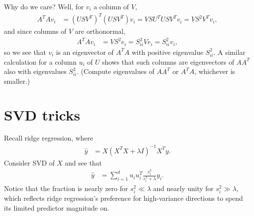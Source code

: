\documentclass[11pt,letterpaper]{article}
\theoremstyle{definition}
\theoremstyle{plain}
\numberwithin{equation}{section}
\numberwithin{figure}{section}
\begin{document}
Why do we care? Well, for $v_i$ a column of $V$,
%
\begin{align}
	A^T A v_i &= (USV^T)^T(USV^T)v_i = V S U^T U S V^T v_i = V S^2 V^T v_i,
\end{align}
%
and since columns of $V$ are orthonormal,
%
\begin{align}
	A^T A v_i &= V S^2 e_i = S_{ii}^2 V e_i = S_{ii}^2 v_i,
\end{align}
%
so we see that $v_i$ is an eigenvector of $A^T A$ with positive eigenvalue $S_{ii}^2$. A similar calculation for a column $u_i$ of $U$ shows that such columns are eigenvectors of $A A^T$ also with eigenvalues $S_{ii}^2$. (Compute eigenvalues of $A A^T$ or $A^T A$, whichever is smaller.)








\section{SVD tricks}
Recall ridge regression, where
%
\begin{align}
	\hat{y} &= X (X^T X + \lambda I)^{-1} X^T y.
\end{align}
%
Consider SVD of $X$ and see that
%
\begin{align}
	\hat{y} &= \sum_{i=1}^d u_i u_i^T \frac{s_i^2}{s_i^2 + \lambda} y_i.
\end{align}
%
Notice that the fraction is nearly zero for $s_i^2 \ll \lambda$ and nearly unity for $s_i^2 \gg \lambda$, which reflects ridge regression's preference for high-variance directions to spend its limited predictor magnitude on.
\end{document}
